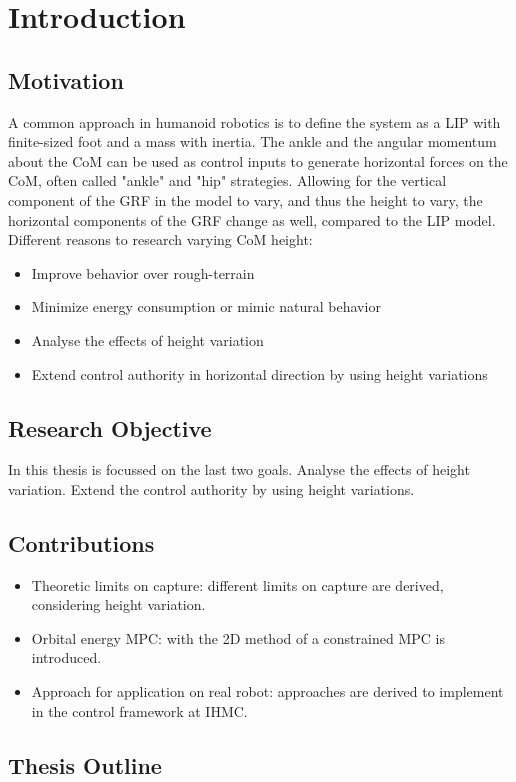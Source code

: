 %
\chapter{Introduction} \label{chap::intro}
\section{Motivation}
A common approach in humanoid robotics is to define the system as a \ac{LIP} with finite-sized foot and a mass with inertia. The ankle and the angular momentum about the \ac{CoM} can be used as control inputs to generate horizontal forces on the \ac{CoM}, often called "ankle" and "hip" strategies. Allowing for the vertical component of the \ac{GRF} in the model to vary, and thus the height to vary, the horizontal components of the \ac{GRF} change as well, compared to the \ac{LIP} model.\\
Different reasons to research varying \ac{CoM} height: 
\begin{itemize}
	\item Improve behavior over rough-terrain
	\item Minimize energy consumption or mimic natural behavior
	\item Analyse the effects of height variation
	\item Extend control authority in horizontal direction by using height variations
\end{itemize}

\section{Research Objective}
In this thesis is focussed on the last two goals. Analyse the effects of height variation. Extend the control authority by using height variations. 

\section{Contributions}
\begin{itemize}
	\item Theoretic limits on capture: different limits on capture are derived, considering height variation.
	\item Orbital energy \ac{MPC}: with the \ac{2D} method of \cite{koolen2016balance} a constrained \ac{MPC} is introduced.
	\item Approach for application on real robot: approaches are derived to implement in the control framework at IHMC.
\end{itemize}
\section{Thesis Outline}


